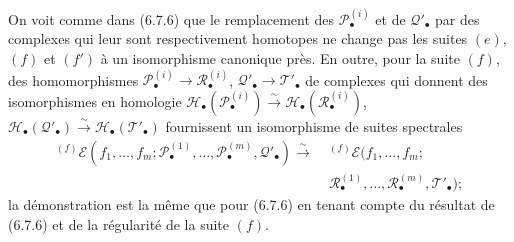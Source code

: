 \begin{remark}[6.9.5]
On voit comme dans (6.7.6) que le remplacement des
$\mathscr P_\bullet^{(i)}$ et de $\mathscr Q'_\bullet$ par des complexes qui
leur sont respectivement homotopes ne change pas les suites $(e)$, $(f)$ et
$(f')$ à un isomorphisme canonique près. En outre, pour la suite $(f)$, des
homomorphismes
$\mathscr P_\bullet^{(i)}\to\mathscr R_\bullet^{(i)}$,
$\mathscr Q'_\bullet\to\mathscr T'_\bullet$ de complexes qui donnent des
isomorphismes en homologie
$\mathscr H_\bullet(\mathscr P_\bullet^{(i)})\xrightarrow{\sim}
\mathscr H_\bullet(\mathscr R_\bullet^{(i)})$,
$\mathscr H_\bullet(\mathscr Q'_\bullet)\xrightarrow{\sim}
\mathscr H_\bullet(\mathscr T'_\bullet)$ fournissent un isomorphisme de suites
spectrales
\[
\begin{split}
  {}^{(f)}\mathscr E
  (f_1,\ldots,f_m;
   \mathscr P_\bullet^{(1)},\ldots,\mathscr P_\bullet^{(m)},
   \mathscr Q'_\bullet)
  \xrightarrow{\sim}\;&
  {}^{(f)}\mathscr E
  (f_1,\ldots,f_m;\\
  &\mathscr R_\bullet^{(1)},\ldots,\mathscr R_\bullet^{(m)},
   \mathscr T'_\bullet);
\end{split}
\]
la démonstration est la même que pour (6.7.6) en tenant compte du résultat
de (6.7.6) et de la régularité de la suite $(f)$.
\end{remark}

